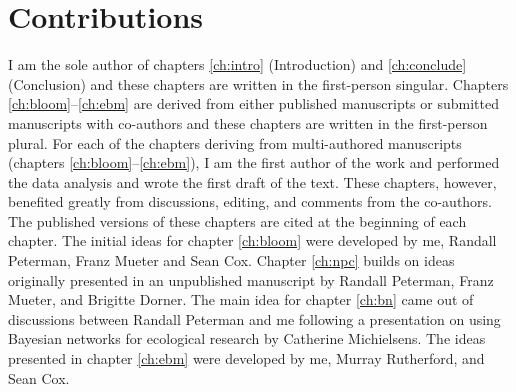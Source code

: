 \section{Contributions}

I am the sole author of chapters \ref{ch:intro} (Introduction) and
\ref{ch:conclude} (Conclusion) and these chapters are written in the
first-person singular. Chapters \ref{ch:bloom}--\ref{ch:ebm} are derived from
either published manuscripts or submitted manuscripts with co-authors and these
chapters are written in the first-person plural. For each of the chapters
deriving from multi-authored manuscripts (chapters
\ref{ch:bloom}--\ref{ch:ebm}), I am the first author of the work and performed
the data analysis and wrote the first draft of the text. These chapters,
however, benefited greatly from discussions, editing, and comments from the
co-authors. The published versions of these chapters are cited at the beginning
of each chapter. The initial ideas for chapter \ref{ch:bloom} were developed by
me, Randall Peterman, Franz Mueter and Sean Cox. Chapter \ref{ch:npc} builds on
ideas originally presented in an unpublished manuscript by Randall Peterman,
Franz Mueter, and Brigitte Dorner. The main idea for chapter \ref{ch:bn} came
out of discussions between Randall Peterman and me following a presentation on
using Bayesian networks for ecological research by Catherine Michielsens. The
ideas presented in chapter \ref{ch:ebm} were developed by me, Murray Rutherford,
and Sean Cox.
